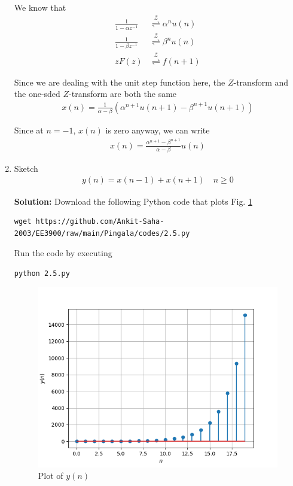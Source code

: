 \documentclass[journal,12pt,twocolumn]{IEEEtran}
\newcommand{\solution}{\noindent \textbf{Solution: }}
\providecommand{\brak}[1]{\ensuremath{\left(#1\right)}}
\providecommand{\ztrans}{\overset{\mathcal{Z}}{ \rightleftharpoons}}
\numberwithin{equation}{section}
\renewcommand\thesection{\arabic{section}}
\begin{document}
\begin{enumerate}[label=\thesection.\arabic*,ref=\thesection.\theenumi]
We know that
\begin{align}
	\frac{1}{1 - \alpha z^{-1}} &\ztrans \alpha^n u(n) \\
	\frac{1}{1 - \beta z^{-1}} &\ztrans \beta^n u(n) \\
	zF(z) &\ztrans f(n+1)
\end{align}

Since we are dealing with the unit step function here, the $Z$-transform and the one-sded $Z$-transform are both the same
\begin{align}
	x(n) = \frac{1}{\alpha - \beta}  \brak{\alpha^{n+1} u(n+1) - \beta^{n+1} u(n+1)}
\end{align}

Since at $n=-1$, $x(n)$ is zero anyway, we can write
\begin{align}
	x(n) = \frac{\alpha^{n+1} - \beta^{n+1}}{\alpha - \beta} u(n)
\end{align}

	\item Sketch 
\begin{align}
	y(n) = x\brak{n-1} + x\brak{n+1}  \quad n \ge 0
	\label{eq:10-orig-diff-rev}
\end{align}

\solution
Download the following Python code that plots Fig. \ref{fig-2}
\begin{lstlisting}
wget https://github.com/Ankit-Saha-2003/EE3900/raw/main/Pingala/codes/2.5.py
\end{lstlisting}

Run the code by executing
\begin{lstlisting}
python 2.5.py
\end{lstlisting}

\begin{figure}[!htp]
    \includegraphics[width=\columnwidth]{figs/fig-2.png}
    \caption{Plot of $y(n)$}
    \label{fig-2}
\end{figure}


\end{enumerate}
\end{document}
